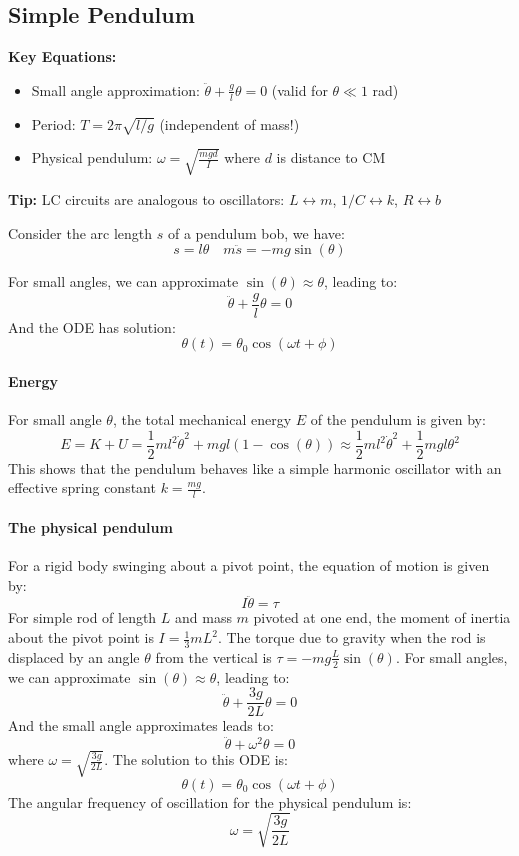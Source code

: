 \documentclass[11pt]{report}
\begin{document}
\subsection{Simple Pendulum}

\begin{keybox}
\textbf{Key Equations:}
\begin{itemize}
    \item Small angle approximation: $\ddot{\theta} + \frac{g}{l}\theta = 0$ (valid for $\theta \ll 1$ rad)
    \item Period: $T = 2\pi\sqrt{l/g}$ (independent of mass!)
    \item Physical pendulum: $\omega = \sqrt{\frac{mgd}{I}}$ where $d$ is distance to CM
\end{itemize}
\textbf{Tip:} LC circuits are analogous to oscillators: $L \leftrightarrow m$, $1/C \leftrightarrow k$, $R \leftrightarrow b$
\end{keybox}

Consider the arc length \( s \) of a pendulum bob, we have:
$$
    s = l\theta \quad m\ddot{s} = -mg\sin(\theta)
$$

For small angles, we can approximate \( \sin(\theta) \approx \theta \), leading to:
$$
    \ddot{\theta} + \frac{g}{l}\theta = 0
$$
And the ODE has solution:
$$
    \theta(t) = \theta_0 \cos(\omega t + \phi)
$$

\paragraph{Energy} For small angle $\theta$, the total mechanical energy \( E \) of the pendulum is given by:
$$
    E = K + U = \frac{1}{2}ml^2\dot{\theta}^2 + mgl(1 - \cos(\theta)) \approx \frac{1}{2}ml^2\dot{\theta}^2 + \frac{1}{2}mgl\theta^2
$$
This shows that the pendulum behaves like a simple harmonic oscillator with an effective spring constant \( k = \frac{mg}{l} \).    


\paragraph{The physical pendulum} For a rigid body swinging about a pivot point, the equation of motion is given by:
$$
    I\ddot{\theta} = \tau 
$$
For simple rod of length \( L \) and mass \( m \) pivoted at one end, the moment of inertia about the pivot point is \( I = \frac{1}{3}mL^2 \). The torque due to gravity when the rod is displaced by an angle \( \theta \) from the vertical is \( \tau = -mg\frac{L}{2}\sin(\theta) \). For small angles, we can approximate \( \sin(\theta) \approx \theta \), leading to:
$$
    \ddot{\theta} + \frac{3g}{2L}\theta = 0
$$
And the small angle approximates leads to:
$$
    \ddot{\theta} + \omega^2 \theta = 0
$$
where \( \omega = \sqrt{\frac{3g}{2L}} \). The solution to this ODE is:
$$
    \theta(t) = \theta_0 \cos(\omega t + \phi)
$$
The angular frequency of oscillation for the physical pendulum is:
$$
    \omega = \sqrt{\frac{3g}{2L}}
$$
\end{document}
